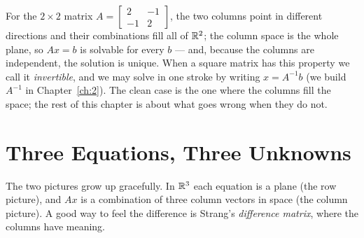 


For the $2\times2$ matrix $A=\left[\begin{smallmatrix}2&-1\\-1&2\end{smallmatrix}\right]$, the two columns point in different directions and their combinations fill all of $\mathbb{R}^2$; the column space is the whole plane, so $Ax=b$ is solvable for every $b$ --- and, because the columns are independent, the solution is unique. When a square matrix has this property we call it \emph{invertible}, and we may solve in one stroke by writing $x=A^{-1}b$ (we build $A^{-1}$ in Chapter~\ref{ch:2}). The clean case is the one where the columns fill the space; the rest of this chapter is about what goes wrong when they do not.

\section{Three Equations, Three Unknowns}

The two pictures grow up gracefully. In $\mathbb{R}^3$ each equation is a plane (the row picture), and $Ax$ is a combination of three column vectors in space (the column picture). A good way to feel the difference is Strang's \emph{difference matrix}, where the columns have meaning.


